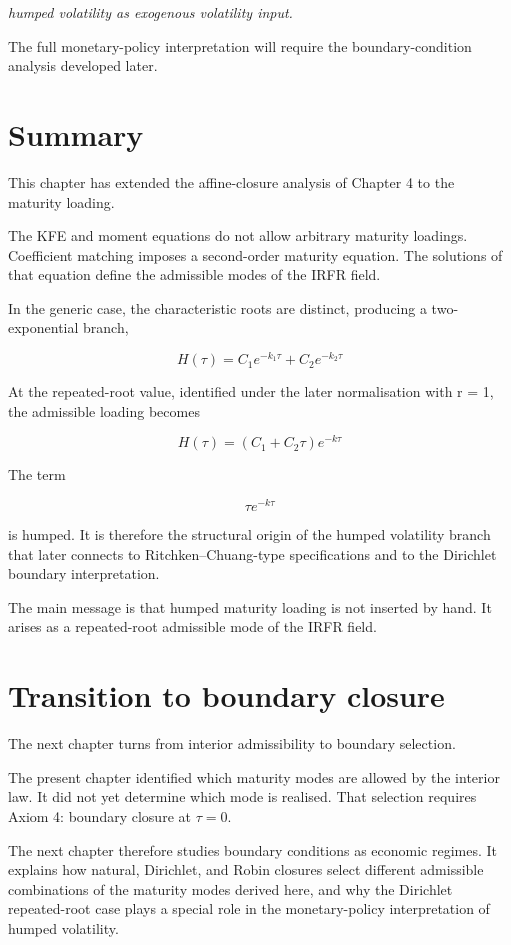 \documentclass[11pt,oneside]{book}
\begin{document}
\begin{center}\emph{humped volatility as exogenous volatility input.}\end{center}
The full monetary-policy interpretation will require the
boundary-condition analysis developed later.

\section{Summary}

This chapter has extended the affine-closure analysis of Chapter 4 to
the maturity loading.

The KFE and moment equations do not allow arbitrary maturity loadings.
Coefficient matching imposes a second-order maturity equation. The
solutions of that equation define the admissible modes of the IRFR
field.

In the generic case, the characteristic roots are distinct, producing a
two-exponential branch,

\[
H(\tau) = C_1e^{-k_1\tau} + C_2e^{-k_2\tau}
\]

At the repeated-root value, identified under the later normalisation
with r = 1, the admissible loading becomes

\[
H(\tau) = (C_1 + C_2\tau)e^{-k\tau}
\]

The term

\[
\tau e^{-k\tau}
\]

is humped. It is therefore the structural origin of the humped
volatility branch that later connects to Ritchken--Chuang-type
specifications and to the Dirichlet boundary interpretation.

The main message is that humped maturity loading is not inserted by
hand. It arises as a repeated-root admissible mode of the IRFR field.

\section{Transition to boundary closure}

The next chapter turns from interior admissibility to boundary
selection.

The present chapter identified which maturity modes are allowed by the
interior law. It did not yet determine which mode is realised. That
selection requires Axiom 4: boundary closure at $\tau=0$.

The next chapter therefore studies boundary conditions as economic
regimes. It explains how natural, Dirichlet, and Robin closures select
different admissible combinations of the maturity modes derived here,
and why the Dirichlet repeated-root case plays a special role in the
monetary-policy interpretation of humped volatility.
\end{document}
